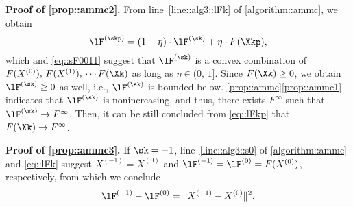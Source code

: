 \vspace{0.8em}
\noindent\textbf{Proof of \ref{prop::ammc2}.\;} From line~\ref{line::alg3::lFk} of \cref{algorithm::ammc}, we obtain
\begin{equation}\label{eq::lFkp}
	\lF^{(\skp)} = (1-\eta)\cdot \lF^{(\sk)} + \eta\cdot F(\Xkp),
\end{equation}
which and \cref{eq::sF0011} suggest that $\lF^{(\sk)}$ is a convex combination of $F(X^{(0)}),\,F(X^{(1)}),\,\cdots F(\Xk)$ as long as $\eta\in(0,\,1]$. Since $F(\Xk)\geq 0$, we obtain $\lF^{(\sk)} \geq 0$ as well, i.e., $\lF^{(\sk)}$ is bounded below. \cref{prop::ammc}\ref{prop::ammc1} indicates that $\lF^{(\sk)}$ is nonincreasing, and thus, there exists $F^{\infty}$ such that $\lF^{(\sk)}\rightarrow F^{\infty}$. Then, it can be still concluded from \cref{eq::lFkp} that $F(\Xk)\rightarrow F^{\infty}$.

\vspace{0.8em}
\noindent\textbf{Proof of \ref{prop::ammc3}.\;}
If $\sk=-1$, line~\ref{line::alg3::s0} of \cref{algorithm::ammc} and \cref{eq::lFk} suggest $X^{(-1)}=X^{(0)}$  and $\lF^{(-1)}=\lF^{(0)}=F(X^{(0)})$, respectively, from which we conclude
\begin{equation}\label{eq::lF01}
	\lF^{(-1)}-\lF^{(0)}=\|X^{(-1)}-X^{(0)}\|^2.
\end{equation}

